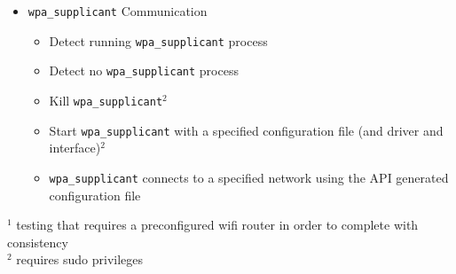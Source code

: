\documentclass[11pt]{article}
\begin{document}
\begin{itemize}
  \item \texttt{wpa\_supplicant} Communication
  \begin{itemize}
    \item Detect running \texttt{wpa\_supplicant} process
    \item Detect no \texttt{wpa\_supplicant} process
    \item Kill \texttt{wpa\_supplicant}$^2$
    \item Start \texttt{wpa\_supplicant} with a specified configuration file (and driver and interface)$^2$
    \item \texttt{wpa\_supplicant} connects to a specified network using the API generated configuration file
  \end{itemize}

\end{itemize}

\small$^1$ testing that requires a preconfigured wifi router in order to complete with consistency\\
\small$^2$ requires sudo privileges
\end{document}
